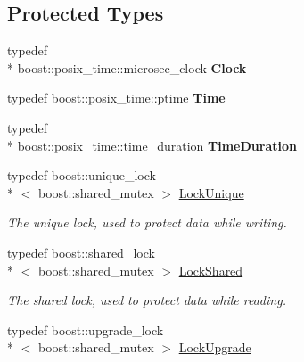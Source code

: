\subsection*{Protected Types}
\begin{DoxyCompactItemize}
\item 
\hypertarget{classOmniBase_a46bff542660db9dadc41f044159b3b6a}{typedef \\*
boost\-::posix\-\_\-time\-::microsec\-\_\-clock {\bfseries Clock}}\label{classOmniBase_a46bff542660db9dadc41f044159b3b6a}

\item 
\hypertarget{classOmniBase_a4e45d98f32711195ffee4cfaadb535e9}{typedef boost\-::posix\-\_\-time\-::ptime {\bfseries Time}}\label{classOmniBase_a4e45d98f32711195ffee4cfaadb535e9}

\item 
\hypertarget{classOmniBase_accb4adedacf66489514f1a9fd9d564a4}{typedef \\*
boost\-::posix\-\_\-time\-::time\-\_\-duration {\bfseries Time\-Duration}}\label{classOmniBase_accb4adedacf66489514f1a9fd9d564a4}

\item 
\hypertarget{classOmniBase_ad03370b447b9b46cb62d6ebb002d7c37}{typedef boost\-::unique\-\_\-lock\\*
$<$ boost\-::shared\-\_\-mutex $>$ \hyperlink{classOmniBase_ad03370b447b9b46cb62d6ebb002d7c37}{Lock\-Unique}}\label{classOmniBase_ad03370b447b9b46cb62d6ebb002d7c37}

\begin{DoxyCompactList}\small\item\em The unique lock, used to protect data while writing. \end{DoxyCompactList}\item 
\hypertarget{classOmniBase_af9820aff8dc6ff7e8120bde218d557ca}{typedef boost\-::shared\-\_\-lock\\*
$<$ boost\-::shared\-\_\-mutex $>$ \hyperlink{classOmniBase_af9820aff8dc6ff7e8120bde218d557ca}{Lock\-Shared}}\label{classOmniBase_af9820aff8dc6ff7e8120bde218d557ca}

\begin{DoxyCompactList}\small\item\em The shared lock, used to protect data while reading. \end{DoxyCompactList}\item 
\hypertarget{classOmniBase_a7c9de7ece34c2c51e6922925fe5f11d7}{typedef boost\-::upgrade\-\_\-lock\\*
$<$ boost\-::shared\-\_\-mutex $>$ \hyperlink{classOmniBase_a7c9de7ece34c2c51e6922925fe5f11d7}{Lock\-Upgrade}}\label{classOmniBase_a7c9de7ece34c2c51e6922925fe5f11d7}


\end{DoxyCompactItemize}
